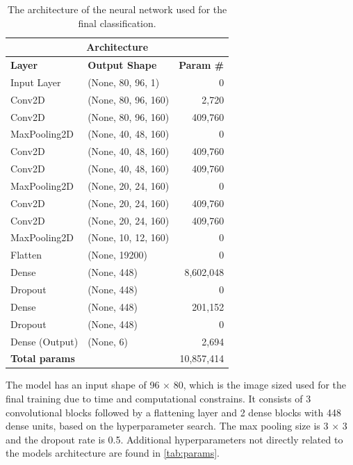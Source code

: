 \begin{table}[H]
    \caption{The architecture of the neural network used for the final classification.}
    \vspace{0.2cm}
    \label{tab:arch}
    \centering
    \begin{adjustbox}{max width=\textwidth}
    \begin{tabular}{l|l|r}
        \toprule
        \multicolumn{3}{c}{\textbf{Architecture}} \\
        \midrule
        \textbf{Layer} & \textbf{Output Shape} & \textbf{Param \#} \\
        \midrule
        Input Layer & (None, 80, 96, 1) & 0 \\
        Conv2D & (None, 80, 96, 160) & 2,720 \\
        Conv2D & (None, 80, 96, 160) & 409,760 \\
        MaxPooling2D & (None, 40, 48, 160) & 0 \\
        Conv2D & (None, 40, 48, 160) & 409,760 \\
        Conv2D & (None, 40, 48, 160) & 409,760 \\
        MaxPooling2D & (None, 20, 24, 160) & 0 \\
        Conv2D & (None, 20, 24, 160) & 409,760 \\
        Conv2D & (None, 20, 24, 160) & 409,760 \\
        MaxPooling2D & (None, 10, 12, 160) & 0 \\
        Flatten & (None, 19200) & 0 \\
        Dense & (None, 448) & 8,602,048 \\
        Dropout & (None, 448) & 0 \\
        Dense & (None, 448) & 201,152 \\
        Dropout & (None, 448) & 0 \\
        Dense (Output) & (None, 6) & 2,694 \\
        \midrule
        \multicolumn{2}{l|}{\textbf{Total params}} & 10,857,414 \\
        \bottomrule
    \end{tabular}
    \end{adjustbox}
\end{table}
\noindent
The model has an input shape of 96 $\times$ 80, which is the image sized used for the final training due to time and computational constrains. It consists of 3 convolutional blocks followed by a flattening layer and 2 dense blocks with 448 dense units, based on the hyperparameter search. The max pooling size is 3 $\times$ 3 and the dropout rate is 0.5. Additional hyperparameters not directly related to the models architecture are found in \autoref{tab:params}.
